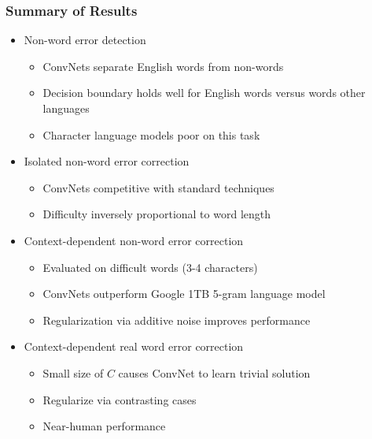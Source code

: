 \begin{frame}
\frametitle{Summary of Results}
\begin{itemize}
    \item Non-word error detection
        \begin{itemize}
            \item ConvNets separate English words from non-words
            \item Decision boundary holds well for English words versus words other languages
            \item Character language models poor on this task 
        \end{itemize}
    \item Isolated non-word error correction
        \begin{itemize}
            \item ConvNets competitive with standard techniques
            \item Difficulty inversely proportional to word length 
        \end{itemize}
    \item Context-dependent non-word error correction
        \begin{itemize}
            \item Evaluated on difficult words (3-4 characters) 
            \item ConvNets outperform Google 1TB 5-gram language model 
            \item Regularization via additive noise improves performance
        \end{itemize}
    \item Context-dependent real word error correction
        \begin{itemize}
            \item Small size of $C$ causes ConvNet to learn trivial solution
            \item Regularize via contrasting cases 
            \item Near-human performance 
        \end{itemize}
\end{itemize}
\end{frame}